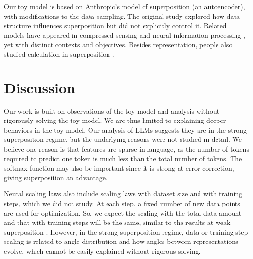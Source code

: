 \documentclass{article}
\begin{document}
Our toy model is based on Anthropic’s model of superposition \cite{elhage2022superposition} (an autoencoder), with modifications to the data sampling. The original study explored how data structure influences superposition but did not explicitly control it. Related models have appeared in compressed sensing \cite{donoho2006compressed,candes2006robust,baraniuk2007compressive,ganguli2012compressed,advani2016statistical} and neural information processing \cite{olshausen1996emergence,babadi2014sparseness}, yet with distinct contexts and objectives. Besides representation, people also studied calculation in superposition \cite{hanni2024mathematical,adler2024complexity}.

\section{Discussion}\label{sec:discussion}

Our work is built on observations of the toy model and analysis without rigorously solving the toy model. We are thus limited to explaining deeper behaviors in the toy model. Our analysis of LLMs suggests they are in the strong superposition regime, but the underlying reasons were not studied in detail. We believe one reason is that features are sparse in language, as the number of tokens required to predict one token is much less than the total number of tokens. The softmax function may also be important since it is strong at error correction, giving superposition an advantage.

Neural scaling laws also include scaling laws with dataset size and with training steps, which we did not study. At each step, a fixed number of new data points are used for optimization. So, we expect the scaling with the total data amount and that with training steps will be the same, similar to the results at weak superposition \cite{michaud2023quantization}. However, in the strong superposition regime, data or training step scaling is related to angle distribution and how angles between representations evolve, which cannot be easily explained without rigorous solving.
\end{document}
